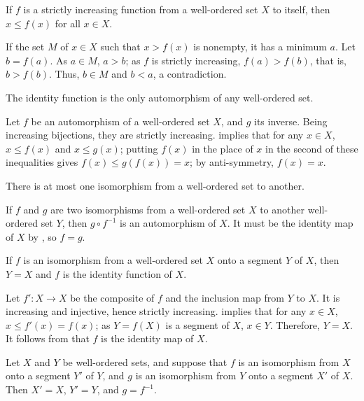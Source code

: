 \documentclass{article}
\begin{document}
\begin{theorem}
  \label{thm:hw1jxum0}
  If \(f\) is a strictly increasing function from a well-ordered set
  \(X\) to itself, then \(x \leq f(x)\) for all \(x \in X\).
\end{theorem}

If the set \(M\) of \(x \in X\) such that \(x > f(x)\) is nonempty, it
has a minimum \(a\).  Let \(b = f(a)\).  As \(a \in M\), \(a > b\); as
\(f\) is strictly increasing, \(f(a) > f(b)\), that is, \(b > f(b)\).
Thus, \(b \in M\) and \(b < a\), a contradiction.

\begin{theorem}
  \label{thm:yvftewxp}
  The identity function is the only automorphism of any well-ordered
  set.
\end{theorem}

Let \(f\) be an automorphism of a well-ordered set \(X\), and \(g\)
its inverse.  Being increasing bijections, they are strictly
increasing.   implies that for any \(x \in X\),
\(x \leq f(x)\) and \(x \leq g(x)\); putting \(f(x)\) in the place of
\(x\) in the second of these inequalities gives
\(f(x) \leq g(f(x)) = x\); by anti-symmetry, \(f(x) = x\).

\begin{theorem}
  \label{thm:uvocd4lt}
  There is at most one isomorphism from a well-ordered set to another.
\end{theorem}

If \(f\) and \(g\) are two isomorphisms from a well-ordered set \(X\)
to another well-ordered set \(Y\), then \(g \circ f^{-1}\) is an
automorphism of \(X\).  It must be the identity map of \(X\) by
, so \(f = g\).

\begin{theorem}
  \label{thm:q14zcdkw}
  If \(f\) is an isomorphism from a well-ordered set \(X\) onto a
  segment \(Y\) of \(X\), then \(Y = X\) and \(f\) is the identity
  function of \(X\).
\end{theorem}

Let \(f' : X \to X\) be the composite of \(f\) and the inclusion map
from \(Y\) to \(X\).  It is increasing and injective, hence strictly
increasing.   implies that for any \(x \in X\),
\(x \leq f'(x) = f(x)\); as \(Y = f(X)\) is a segment of \(X\),
\(x \in Y\).  Therefore, \(Y = X\).  It follows from
 that \(f\) is the identity map of \(X\).

\begin{theorem}
  \label{thm:7z7bwher}
  Let \(X\) and \(Y\) be well-ordered sets, and suppose that \(f\) is
  an isomorphism from \(X\) onto a segment \(Y'\) of \(Y\), and \(g\)
  is an isomorphism from \(Y\) onto a segment \(X'\) of \(X\).  Then
  \(X' = X\), \(Y' = Y\), and \(g = f^{-1}\).
\end{theorem}
\end{document}
